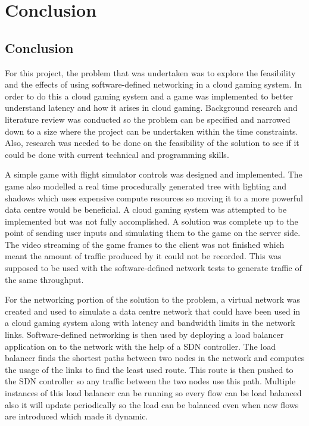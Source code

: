 \chapter{Conclusion}
\label{chapter6}

\section{Conclusion}
For this project, the problem that was undertaken was to explore the feasibility and the effects of using software-defined networking in a cloud gaming system. In order to do this a cloud gaming system and a game was implemented to better understand latency and how it arises in cloud gaming. Background research and literature review was conducted so the problem can be specified and narrowed down to a size where the project can be undertaken within the time constraints. Also, research was needed to be done on the feasibility of the solution to see if it could be done with current technical and programming skills.
\newline
\par
A simple game with flight simulator controls was designed and implemented. The game also modelled a real time procedurally generated tree with lighting and shadows which uses expensive compute resources so moving it to a more powerful data centre would be beneficial. A cloud gaming system was attempted to be implemented but was not fully accomplished. A solution was complete up to the point of sending user inputs and simulating them to the game on the server side. The video streaming of the game frames to the client was not finished which meant the amount of traffic produced by it could not be recorded. This was supposed to be used with the software-defined network tests to generate traffic of the same throughput.
\newline
\par
For the networking portion of the solution to the problem, a virtual network was created and used to simulate a data centre network that could have been used in a cloud gaming system along with latency and bandwidth limits in the network links. Software-defined networking is then used by deploying a load balancer application on to the network with the help of a SDN controller. The load balancer finds the shortest paths between two nodes in the network and computes the usage of the links to find the least used route. This route is then pushed to the SDN controller so any traffic between the two nodes use this path. Multiple instances of this load balancer can be running so every flow can be load balanced also it will update periodically so the load can be balanced even when new flows are introduced which made it dynamic.
